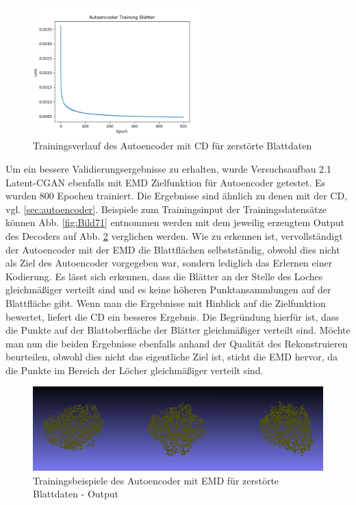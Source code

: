 \documentclass{llncs}
\begin{document}
\begin{figure}[htbp] 
	\centering
	\includegraphics[width=0.6\textwidth]{autoencoder_training_blaetter_result.png}
	\caption{Trainingsverlauf des Autoencoder mit CD für zerstörte Blattdaten}
	\label{fig:Bild67}
\end{figure}
\pagebreak\linebreak 
Um ein bessere Validierungsergebnisse zu erhalten, wurde Versuchsaufbau 2.1 Latent-CGAN ebenfalls mit EMD Zielfunktion für Autoencoder getestet. Es wurden 800 Epochen trainiert. Die Ergebnisse sind ähnlich zu denen mit der CD, vgl. \ref{sec:autoencoder}. Beispiele zum Trainingsinput der Trainingsdatensätze können Abb. \ref{fig:Bild71} entnommen werden mit dem jeweilig erzeugtem Output des Decoders auf Abb. \ref{fig:Bild72} verglichen werden. Wie zu erkennen ist, vervollständigt der Autoencoder mit der EMD die Blattflächen selbstständig, obwohl dies nicht als Ziel des Autoencoder vorgegeben war, sondern lediglich das Erlernen einer Kodierung. Es lässt sich erkennen, dass die Blätter an der Stelle des Loches gleichmäßiger verteilt sind und es keine höheren Punktansammlungen auf der Blattfläche gibt. Wenn man die Ergebnisse mit Hinblick auf die Zielfunktion bewertet, liefert die CD ein besseres Ergebnis. Die Begründung hierfür ist, dass die Punkte auf der Blattoberfläche der Blätter gleichmäßiger verteilt sind. Möchte man nun die beiden Ergebnisse ebenfalls anhand der Qualität des Rekonstruieren beurteilen, obwohl dies nicht das eigentliche Ziel ist, sticht die EMD hervor, da die Punkte im Bereich der Löcher gleichmäßiger verteilt sind.
\begin{figure}[htbp] 
	\centering
	\includegraphics[width=1.0\textwidth]{repairded_emd.png}
	\caption{Trainingsbeispiele des Autoencoder mit EMD für zerstörte Blattdaten - Output}
	\label{fig:Bild72}
\end{figure}
\end{document}
